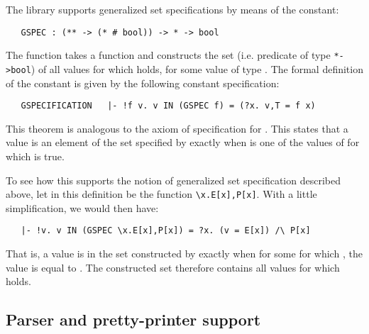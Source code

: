The  library supports generalized set specifications by means of
the constant:

\begin{hol}
\begin{verbatim}
   GSPEC : (** -> (* # bool)) -> * -> bool
\end{verbatim}\end{hol}

\noindent The function  takes a function 
and constructs the set (i.e. predicate of type {\small\verb!*->bool!}) of all
values  for which  holds, for some value  of
type \ml{**}. The formal definition of the constant  is given by the
following constant specification:

\begin{hol}
\begin{verbatim}
   GSPECIFICATION   |- !f v. v IN (GSPEC f) = (?x. v,T = f x)
\end{verbatim}\end{hol}

\noindent This theorem is analogous to the axiom of specification for .
This states that a value  is an element of the set specified by
 exactly when  is one of the values of  for which
 is true.

To see how this supports the notion of generalized set specification described
above, let  in this definition be the function
{\small\verb!\x.E[x],P[x]!}.  With a little simplification, we would then have:

\begin{hol}
\begin{verbatim}
   |- !v. v IN (GSPEC \x.E[x],P[x]) = ?x. (v = E[x]) /\ P[x]
\end{verbatim}\end{hol}

\noindent That is, a value  is in the set constructed by 
exactly when for some  for which , the value  is equal to
.  The constructed set therefore contains all values  for
which  holds.

\subsection{Parser and pretty-printer support}\label{abst}

